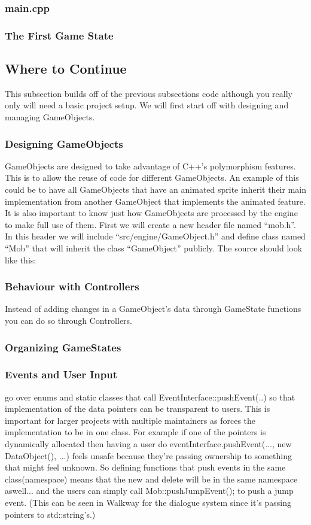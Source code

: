 \documentclass[12pt]{article}
\begin{document}
\subsubsection{main.cpp}
\subsubsection{The First Game State}
\subsection{Where to Continue}
This subsection builds off of the previous subsections code although you really only will need a basic project setup. We will first start off with designing and managing GameObjects.
\subsubsection{Designing GameObjects}
GameObjects are designed to take advantage of C++'s polymorphism features. This is to allow the reuse of code for different GameObjects.
An example of this could be to have all GameObjects that have an animated sprite inherit their main implementation from another GameObject that implements the animated feature. It is also important to know just how GameObjects are processed by the engine to make full use of them. First we will create a new header  file named ``mob.h''. In this header we will include ``src/engine/GameObject.h'' and define class named ``Mob'' that will inherit the class ``GameObject'' publicly. The source should look like this:
\subsubsection{Behaviour with Controllers}
Instead of adding changes in a GameObject's data through GameState functions you can do so through Controllers.

\subsubsection{Organizing GameStates}
\subsubsection{Events and User Input}
go over enums and static classes that call EventInterface::pushEvent(..) so that implementation of the data pointers can be transparent to users. This is important for larger projects with multiple maintainers as forces the implementation to be in one class. For example if one of the pointers is dynamically allocated then having a user do eventInterface.pushEvent(..., new DataObject(), ...) feels unsafe because they're passing ownership to something that might feel unknown. So defining functions that push events in the same class(namespace) means that the new and delete will be in the same namespace aswell... and the users can simply call Mob::pushJumpEvent(); to push a jump event. (This can be seen in Walkway for the dialogue system since it's passing pointers to std::string's.)
\end{document}
